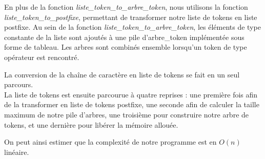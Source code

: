 \documentclass{article}
\begin{document}
\vspace{5px}
En plus de la fonction \textit{liste\_token\_to\_arbre\_token}, nous utilisons la fonction \\ \textit{liste\_token\_to\_postfixe}, permettant de transformer notre liste de tokens en liste postfixe.
Au sein de la fonction \textit{liste\_token\_to\_arbre\_token}, les éléments de type constante de la liste sont ajoutés à une pile d'arbre\_token implémentée sous forme de tableau. Les arbres sont combinés ensemble lorsqu'un token de type opérateur est rencontré.

\vspace{5px}
La conversion de la chaîne de caractère en liste de tokens se fait en un seul parcours. \\
La liste de tokens est ensuite parcourue à quatre reprises : une première fois afin de la transformer en liste de tokens postfixe, une seconde afin de calculer la taille maximum de notre pile d'arbres, une troisième pour construire notre arbre de tokens, et une dernière pour libérer la mémoire allouée.

\vspace{5px}
On peut ainsi estimer que la complexité de notre programme est en $O(n)$ linéaire.
\end{document}
